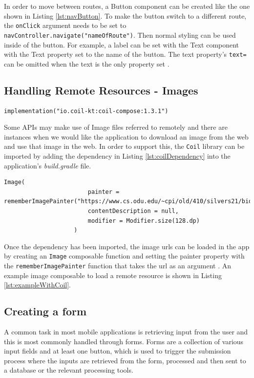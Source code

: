 \documentclass[12pt]{article}
\begin{document}
In order to move between routes, a Button component can be created like the one shown in Listing \ref{lst:navButton}. To make the button switch to a different route, the \verb|onClick| argument needs to be set to \verb|navController.navigate("nameOfRoute")|. Then normal styling can be used inside of the button. For example, a label can be set with the Text component with the Text property set to the name of the button. The text property's \verb|text=| can be omitted when the text is the only property set \cite{mediumJetpackNavigation}.  

\subsection{Handling Remote Resources - Images}
\begin{lstlisting}[numbers=none, 
			caption=Coil Dependency,
			label={lst:coilDependency}]
implementation("io.coil-kt:coil-compose:1.3.1")
\end{lstlisting}
Some APIs may make use of Image files referred to remotely and there are instances when we would like the application to download an image from the web and use that image in the web. In order to support this, the \verb|Coil| library can be imported by adding the dependency in Listing \ref{lst:coilDependency} into the application's \textit{build.gradle} file. 

\begin{lstlisting}[numbers=none, 
			caption=Example Image using Coil,
			label={lst:exampleWithCoil}]
Image(
                        painter = rememberImagePainter("https://www.cs.odu.edu/~cpi/old/410/silvers21/bio/Jacob\_Conner.jpg"),
                        contentDescription = null,
                        modifier = Modifier.size(128.dp)
                    )
\end{lstlisting}


Once the dependency has been imported, the image urls can be loaded in the app by creating an \verb|Image| composable function and setting the painter property with the \verb|rememberImagePainter| function that takes the url as an argument \cite{StackOverflowCoil}. An example image composable to load a remote resource is shown in Listing \ref{lst:exampleWithCoil}.

\subsection{Creating a form}

A common task in most mobile applications is retrieving input from the user and this is most commonly handled through forms. Forms are a collection of various input fields and at least one button, which is used to trigger the submission process where the inputs are retrieved from the form, processed and then sent to a database or the relevant processing tools. 

\end{document}
